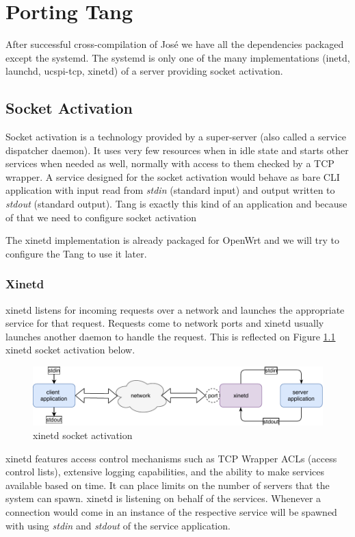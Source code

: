 \chapter{Porting Tang}\label{porting-tang}

After successful cross-compilation of José we have all the dependencies packaged except the systemd.
The systemd is only one of the many implementations (inetd, launchd, ucspi-tcp, xinetd) of a server providing socket activation.



\section{Socket Activation}\label{socket_activation}

Socket activation is a technology provided by a super-server (also called a service dispatcher daemon).
It uses very few resources when in idle state and starts other services when needed as well, normally with access to them checked by a TCP wrapper.
A service designed for the socket activation would behave as bare CLI application with input read from {\it stdin} (standard input) and output written to {\it stdout} (standard output).
Tang is exactly this kind of an application and because of that we need to configure socket activation

The xinetd implementation is already packaged for OpenWrt and we will try to configure the Tang to use it later.



\subsection{Xinetd}
xinetd listens for incoming requests over a network and launches the appropriate service for that request.
Requests come to network ports and xinetd usually launches another daemon to handle the request.
This is reflected on Figure \ref{fig_xinetd} xinetd socket activation below.
\begin{figure}[h]
    \centering
    \includegraphics[scale=0.9]{figures/xinetd.pdf}
    \caption{xinetd socket activation}
    \label{fig_xinetd}
\end{figure}
xinetd features access control mechanisms such as TCP Wrapper ACLs (access control lists), extensive logging capabilities, and the ability to make services available based on time.
It can place limits on the number of servers that the system can spawn.
xinetd is listening on behalf of the services.
Whenever a connection would come in an instance of the respective service will be spawned with using {\it stdin} and {\it stdout} of the service application\cite{xinetd}.


